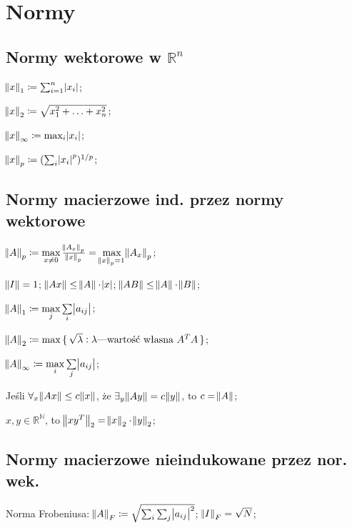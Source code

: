\section{Normy}

\subsection{Normy wektorowe w $\mathbb{R}^n$}

\entry
$\norm{x}_1 \coloneqq \sum^n_{i=1}\abs{x_i}$;

\entry
$\norm{x}_2 \coloneqq \sqrt{x_1^2+\ldots + x_n^2}$;

\entry
$\norm{x}_\infty \coloneqq \max_{i}\abs{x_i}$;

\entry
$\norm{x}_p \coloneqq (\sum_i\abs{x_i}^p)^{1/p}$;

\subsection{Normy macierzowe ind. przez normy wektorowe}

\entry
$\norm{A}_p \coloneqq \max\limits_{x\neq 0} \frac{\norm{A_x}_p}{\norm{x}_p} = \max\limits_{\norm{x}_p = 1} \norm{A_x}_p$;

\entry
$\norm{I} = 1$;
\entry
$\norm{Ax} \leq \norm{A} \cdot \abs{x}$;
\entry
$\norm{AB} \leq \norm{A} \cdot \norm{B}$;

\entry
$\norm{A}_1 \coloneqq \max\limits_j\sum\limits_i\abs{a_{ij}}$;

\entry
$\norm{A}_2 \coloneqq \max\set{\sqrt{\lambda} : \lambda\text{---wartość własna } A^TA}$;

\entry
$\norm{A}_\infty \coloneqq \max\limits_i\sum\limits_j\abs{a_{ij}}$;

\entry
Jeśli $\forall_{x} \norm{Ax}\leq c\norm{x}$, że $\exists_y \norm{Ay} = c\norm{y}$, to $c=\norm{A}$;

\entry
$x,y\in\mathbb{R^N}$, to $\norm{xy^T}_2=\norm{x}_2\cdot\norm{y}_2$;

\subsection{Normy macierzowe nieindukowane przez nor. wek.}

\entry
Norma Frobeniusa: $\norm{A}_F \coloneqq \sqrt{\sum_i\sum_j\abs{a_{ij}}^2}$; $\norm{I}_F=\sqrt{N}$;


